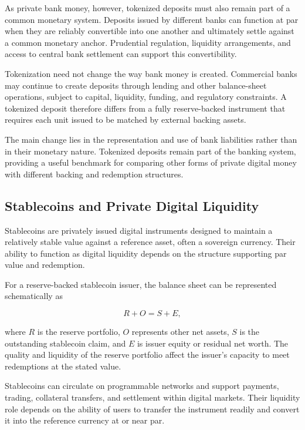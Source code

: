 As private bank money, however, tokenized deposits must also remain part of a common monetary system. Deposits issued by different banks can function at par when they are reliably convertible into one another and ultimately settle against a common monetary anchor. Prudential regulation, liquidity arrangements, and access to central bank settlement can support this convertibility.

Tokenization need not change the way bank money is created. Commercial banks may continue to create deposits through lending and other balance-sheet operations, subject to capital, liquidity, funding, and regulatory constraints. A tokenized deposit therefore differs from a fully reserve-backed instrument that requires each unit issued to be matched by external backing assets.

The main change lies in the representation and use of bank liabilities rather than in their monetary nature. Tokenized deposits remain part of the banking system, providing a useful benchmark for comparing other forms of private digital money with different backing and redemption structures.




\subsection{Stablecoins and Private Digital Liquidity}

Stablecoins are privately issued digital instruments designed to maintain a relatively stable value against a reference asset, often a sovereign currency. Their ability to function as digital liquidity depends on the structure supporting par value and redemption.

For a reserve-backed stablecoin issuer, the balance sheet can be represented schematically as

\begin{equation}
R+O=S+E,
\label{eq:ch24-stablecoin-balance-sheet}
\end{equation}

where \(R\) is the reserve portfolio, \(O\) represents other net assets, \(S\) is the outstanding stablecoin claim, and \(E\) is issuer equity or residual net worth. The quality and liquidity of the reserve portfolio affect the issuer's capacity to meet redemptions at the stated value.

Stablecoins can circulate on programmable networks and support payments, trading, collateral transfers, and settlement within digital markets. Their liquidity role depends on the ability of users to transfer the instrument readily and convert it into the reference currency at or near par.

